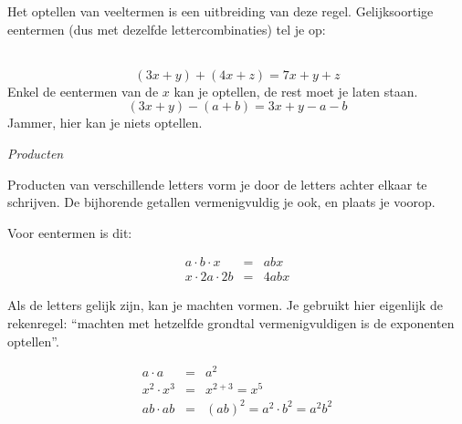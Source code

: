 	Het optellen van veeltermen is een uitbreiding van deze
	regel. Gelijksoortige eentermen (dus met dezelfde lettercombinaties)
	tel je op: 
	
	\begin{voorbeeld}
		\ \\
		\begin{equation*}
		(3x+y)+(4x+z)=7x+y+z
		\end{equation*} Enkel de eentermen van de $x$ kan
		je optellen, de rest moet je laten staan.
		\begin{equation*}
		(3x+y)-(a+b)=3x+y-a-b
		\end{equation*} Jammer, hier kan je niets optellen.
	\end{voorbeeld}
	
	\emph{Producten}
	
	Producten van verschillende letters vorm je door de letters achter
	elkaar te schrijven. De bijhorende getallen vermenigvuldig je ook,
	en plaats je voorop. 
	
	Voor eentermen is dit:
	
	\begin{voorbeeld}
		
	\begin{eqnarray*}
		a\cdot b\cdot x&=&abx\\
		x\cdot2a\cdot2b&=&4abx
	\end{eqnarray*}
	\end{voorbeeld}
	
	Als de letters gelijk zijn, kan je machten vormen. Je gebruikt
	hier eigenlijk de rekenregel: ``machten met hetzelfde grondtal vermenigvuldigen
	is de exponenten optellen''.
	
	\begin{voorbeeld}
		\begin{eqnarray*}
		a\cdot a&=&a^{2}\\
		x^{2}\cdot x^{3}&=&x^{2+3}=x^{5}\\
		ab\cdot ab&=&(ab)^{2}=a^{2}\cdot b^{2}=a^{2}b^{2}
		\end{eqnarray*}
	\end{voorbeeld}

